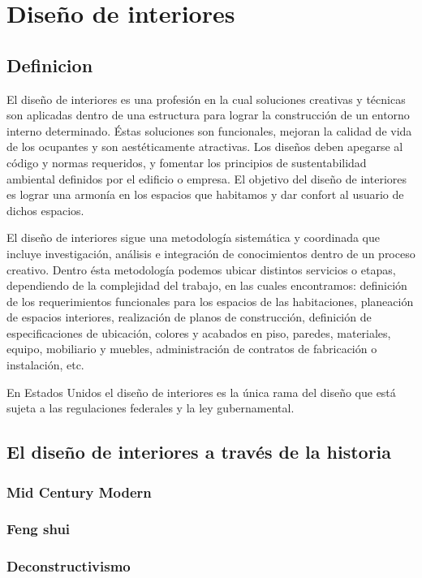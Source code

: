 \section{Diseño de interiores}
\subsection{Definicion}
El diseño de interiores es una profesión en la cual soluciones creativas y técnicas son aplicadas dentro de una estructura para lograr la construcción de un entorno interno determinado. Éstas soluciones son funcionales, mejoran la calidad de vida de los ocupantes y son aestéticamente atractivas. Los diseños deben apegarse al código y normas requeridos, y fomentar los principios de sustentabilidad ambiental definidos por el edificio o empresa. El objetivo del diseño de interiores es lograr una armonía en los espacios que habitamos y dar confort al usuario de dichos espacios.\cite{B01} \par
El diseño de interiores sigue una metodología sistemática y coordinada que incluye investigación, análisis e integración de conocimientos dentro de un proceso creativo. Dentro ésta metodología podemos ubicar distintos servicios o etapas, dependiendo de la complejidad del trabajo, en las cuales encontramos: definición de los requerimientos funcionales para los espacios de las habitaciones, planeación de espacios interiores, realización de planos de construcción, definición de especificaciones de ubicación, colores y acabados en piso, paredes, materiales, equipo, mobiliario y muebles, administración de contratos de fabricación o instalación, etc.\par
En Estados Unidos el diseño de interiores es la única rama del diseño que está sujeta a las regulaciones federales y la ley gubernamental.\cite{B02}
\subsection{El diseño de interiores a través de la historia}

\subsubsection{Mid Century Modern}
\subsubsection{Feng shui}
\subsubsection{Deconstructivismo}
